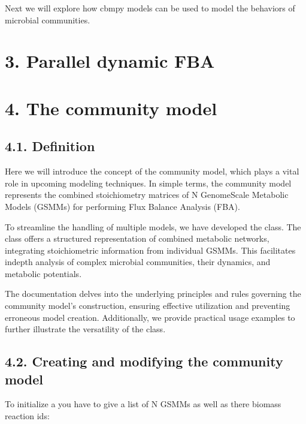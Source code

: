 \documentclass[letterpaper,10pt,english]{sphinxmanual}
\begin{document}
\sphinxAtStartPar
Next we will explore how cbmpy models can be used to model the behaviors of microbial communities.

\sphinxstepscope


\chapter{3. Parallel dynamic FBA}
\label{\detokenize{3_parallel_dfba/home:parallel-dynamic-fba}}\label{\detokenize{3_parallel_dfba/home::doc}}
\sphinxstepscope


\chapter{4. The community model}
\label{\detokenize{4_community_matrix/home:the-community-model}}\label{\detokenize{4_community_matrix/home::doc}}

\section{4.1. Definition}
\label{\detokenize{4_community_matrix/home:definition}}
\sphinxAtStartPar
Here we will introduce the concept of the community model, which plays a vital role in upcoming modeling techniques.
In simple terms, the community model represents the combined stoichiometry matrices of N Genome\sphinxhyphen{}Scale Metabolic Models (GSMMs)
for performing Flux Balance Analysis (FBA).

\sphinxAtStartPar
To streamline the handling of multiple models, we have developed the  class. The class offers a structured representation of combined metabolic networks, integrating stoichiometric
information from individual GSMMs. This facilitates in\sphinxhyphen{}depth analysis of complex microbial communities, their dynamics,
and metabolic potentials.

\sphinxAtStartPar
The documentation delves into the underlying principles and rules governing the community model’s construction, ensuring
effective utilization and preventing erroneous model creation. Additionally, we provide practical usage examples to further
illustrate the versatility of the  class.


\section{4.2. Creating and modifying the community model}
\label{\detokenize{4_community_matrix/home:creating-and-modifying-the-community-model}}
\sphinxAtStartPar
To initialize a  you have to give a list of N GSMMs as well as there biomass reaction ids:
\end{document}
